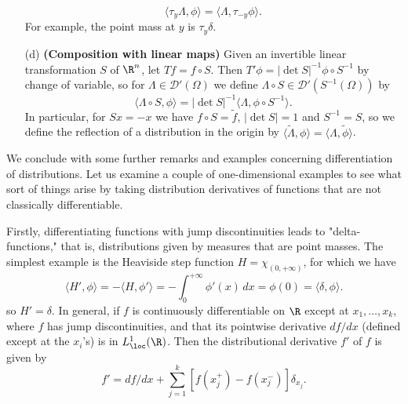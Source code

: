 \begin{example}
\begin{itemize}
\[\langle\tau_y\Lambda,\phi\rangle=\langle\Lambda,\tau_{-y}\phi\rangle.\]
For example, the point mass at $y$ is $\tau_y\delta$. 
\item[(d)] \textbf{(Composition with linear maps)} Given an invertible linear transformation $S$ of $\R^n$, let $Tf=f\circ S$. Then $T'\phi=|\det S|^{-1}\phi\circ S^{-1}$ by change of variable, so for $\Lambda\in\mathscr{D}'(\Omega)$ we define $\Lambda\circ S\in\mathscr{D}'(S^{-1}(\Omega))$ by
\[\langle\Lambda\circ S,\phi\rangle=|\det S|^{-1}\langle\Lambda,\phi\circ S^{-1}\rangle.\]
In particular, for $Sx=-x$ we have $f\circ S=\tilde{f}$, $|\det S|=1$ and $S^{-1}=S$, so we define the reflection of a distribution in the origin by $\langle\widetilde{\Lambda},\phi\rangle=\langle\Lambda,\tilde{\phi}\rangle$.
\end{itemize}
\end{example}
We conclude with some further remarks and examples concerning differentiation of distributions. Let us examine a couple of one-dimensional examples to see what sort of things arise by taking distribution derivatives of functions that are not classically differentiable.\par
Firstly, differentiating functions with jump discontinuities leads to "delta-functions," that is, distributions given by measures that are point masses. The simplest example is the Heaviside step function $H=\chi_{(0,+\infty)}$, for which we have
\[\langle H',\phi\rangle=-\langle H,\phi'\rangle=-\int_0^{+\infty}\phi'(x)\,dx=\phi(0)=\langle\delta,\phi\rangle.\]
so $H'=\delta$. In general, if $f$ is continuously differentiable on $\R$ except at $x_1,\dots,x_k$, where $f$ has jump discontinuities, and that its pointwise derivative $df/dx$ (defined except at the $x_i$'s) is in $L_{\loc}^1(\R)$. Then the distributional derivative $f'$ of $f$ is given by
\[f'=df/dx+\sum_{j=1}^{k}[f(x_j^+)-f(x_j^-)]\delta_{x_j}.\]

